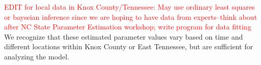 \documentclass[12pt]{article}
\begin{document}
\textcolor{red}{EDIT for local data in Knox County/Tennessee: May use ordinary least squares or bayseian inference since we are hoping to have data from experts--think about after NC State Parameter Estimation workshop; write program for data fitting} \\ 
We recognize that these estimated parameter values vary based on time and different locations within Knox County or East Tennessee, but are sufficient for analyzing the model. 
\end{document}
